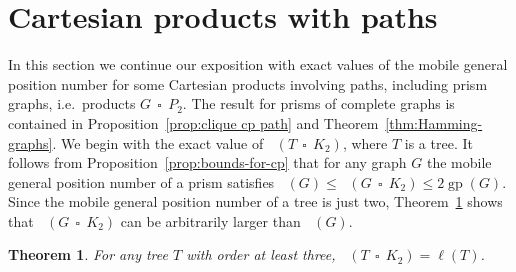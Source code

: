\documentclass[a4paper,12pt]{article}
\DeclareMathOperator{\mob}{Mob_{gp}}
\DeclareMathOperator{\gp}{gp}
\DeclareMathOperator{\cp}{\,\square\,}
\newtheorem{theorem}{Theorem}[section]
\theoremstyle{definition}
\begin{document}
	\section{Cartesian products with paths}
	\label{sec:prisms}
	
	In this section we continue our exposition with exact values of the mobile general position number for some Cartesian products involving paths, including prism graphs, i.e.\ products $G \cp P_2$. The result for prisms of complete graphs is contained in Proposition~\ref{prop:clique cp path} and Theorem~\ref{thm:Hamming-graphs}. We begin with the exact value of $\mob (T \cp K_2)$, where $T$ is a tree. It follows from Proposition~\ref{prop:bounds-for-cp} that for any graph $G$ the mobile general position number of a prism satisfies $\mob (G) \leq \mob (G \cp K_2) \leq 2\gp (G)$. Since the mobile general position number of a tree is just two, Theorem~\ref{thm:prism-tree} shows that $\mob (G \cp K_2)$ can be arbitrarily larger than $\mob (G)$. 
	
	\begin{theorem}
		\label{thm:prism-tree}
		For any tree $T$ with order at least three, $\mob (T \cp K_2) = \ell (T)$.
	\end{theorem}
	
\end{document}
